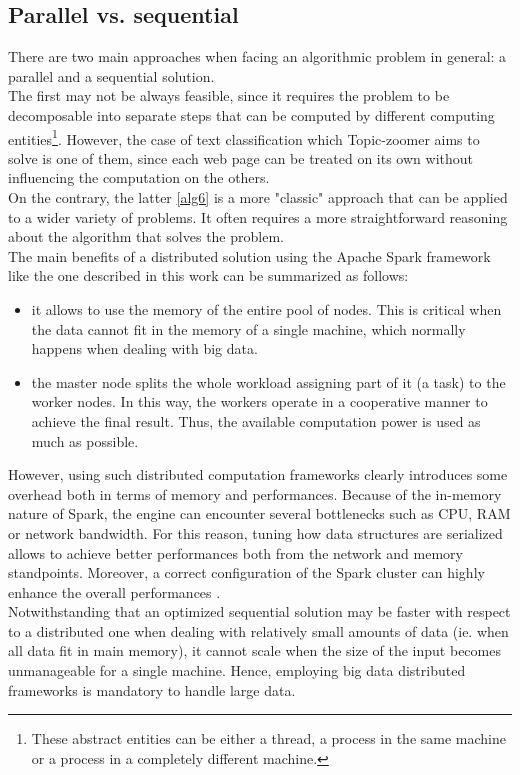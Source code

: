 \documentclass{sig-alternate-05-2015}
\begin{document}
\subsection{Parallel vs. sequential}
There are two main approaches when facing an algorithmic problem in general: a parallel and a sequential solution.\\
The first may not be always feasible, since it requires the problem to be decomposable into separate steps that can be computed by different computing entities\footnote{These abstract entities can be either a thread, a process in the same machine or a process in a completely different machine.}. However, the case of text classification which Topic-zoomer aims to solve is one of them, since each web page can be treated on its own without influencing the computation on the others.\\
On the contrary, the latter \ref{alg6} is a more "classic" approach that can be applied to a wider variety of problems. It often requires a more straightforward reasoning about the algorithm that solves the problem.\\
The main benefits of a distributed solution using the Apache Spark framework like the one described in this work can be summarized as follows:
\begin{itemize}
    \item it allows to use the memory of the entire pool of nodes. This is critical when the data cannot fit in the memory of a single machine, which normally happens when dealing with big data.
    \item the master node splits the whole workload assigning part of it (a task) to the worker nodes. In this way, the workers operate in a cooperative manner to achieve the final result. Thus, the available computation power is used as much as possible.
\end{itemize}
However, using such distributed computation frameworks clearly introduces some overhead both in terms of memory and performances. Because of the in-memory nature of Spark, the engine can encounter several bottlenecks such as CPU, RAM or network bandwidth. For this reason, tuning how data structures are serialized allows to achieve better performances both from the network and memory standpoints. Moreover, a correct configuration of the Spark cluster can highly enhance the overall performances \cite{li2015sparkbench}.\\
Notwithstanding that an optimized sequential solution may be faster with respect to a distributed one when dealing with relatively small amounts of data (ie. when all data fit in main memory), it cannot scale when the size of the input becomes unmanageable for a single machine. Hence, employing big data distributed frameworks is mandatory to handle large data.
\end{document}

